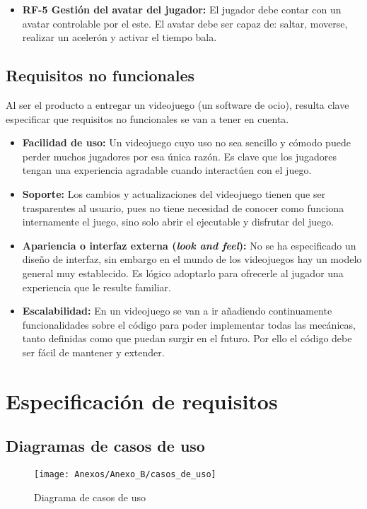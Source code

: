 \begin{itemize}
\item
\textbf{RF-5 Gestión del avatar del jugador:} El jugador debe contar con un avatar controlable por el este. El avatar debe ser capaz de: saltar, moverse, realizar un acelerón y activar el tiempo bala.
\end{itemize}

\subsection{Requisitos no funcionales}
Al ser el producto a entregar un videojuego (un software de ocio), resulta clave especificar que requisitos no funcionales se van a tener en cuenta.

\begin{itemize}
\item
\textbf{Facilidad de uso:} Un videojuego cuyo uso no sea sencillo y cómodo puede perder muchos jugadores por esa única razón. Es clave que los jugadores tengan una experiencia agradable cuando interactúen con el juego.

\item
\textbf{Soporte:} Los cambios y actualizaciones del videojuego tienen que ser trasparentes al usuario, pues no tiene necesidad de conocer como funciona internamente el juego, sino solo abrir el ejecutable y disfrutar del juego.

\item
\textbf{Apariencia o interfaz externa (\textit{look and feel}):} No se ha especificado un diseño de interfaz, sin embargo en el mundo de los videojuegos hay un modelo general muy establecido. Es lógico adoptarlo para ofrecerle al jugador una experiencia que le resulte familiar.

\item
\textbf{Escalabilidad:} En un videojuego se van a ir añadiendo continuamente funcionalidades sobre el código para poder implementar todas las mecánicas, tanto definidas como que puedan surgir en el futuro. Por ello el código debe ser fácil de mantener y extender.
\end{itemize}


\section{Especificación de requisitos}
\subsection{Diagramas de casos de uso}
\begin{figure}[h]
\centering
\texttt{[image: Anexos/Anexo\_B/casos\_de\_uso]}
\caption{Diagrama de casos de uso}
\end{figure}
\clearpage

